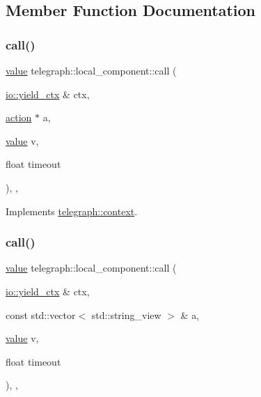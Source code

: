 \subsection{Member Function Documentation}
\mbox{\label{classtelegraph_1_1local__component_af4d74d161754055d3f811bfe95a59f26}} 
\subsubsection{\texorpdfstring{call()}{call()}\hspace{0.1cm}{\footnotesize\ttfamily [1/2]}}
{\footnotesize\ttfamily \hyperlink{classtelegraph_1_1value}{value} telegraph\+::local\+\_\+component\+::call (\begin{DoxyParamCaption}\item[{\hyperlink{structboost_1_1asio_1_1yield__ctx}{io\+::yield\+\_\+ctx} \&}]{ctx,  }\item[{\hyperlink{classtelegraph_1_1action}{action} $\ast$}]{a,  }\item[{\hyperlink{classtelegraph_1_1value}{value}}]{v,  }\item[{float}]{timeout }\end{DoxyParamCaption})\hspace{0.3cm}{\ttfamily [inline]}, {\ttfamily [override]}, {\ttfamily [virtual]}}



Implements \hyperlink{classtelegraph_1_1context_a72da471eb635e5505b10d2f1103359ac}{telegraph\+::context}.

\mbox{\label{classtelegraph_1_1local__component_a6fa6fbf49a0d77a8da54b4a77b578edd}} 
\subsubsection{\texorpdfstring{call()}{call()}\hspace{0.1cm}{\footnotesize\ttfamily [2/2]}}
{\footnotesize\ttfamily \hyperlink{classtelegraph_1_1value}{value} telegraph\+::local\+\_\+component\+::call (\begin{DoxyParamCaption}\item[{\hyperlink{structboost_1_1asio_1_1yield__ctx}{io\+::yield\+\_\+ctx} \&}]{ctx,  }\item[{const std\+::vector$<$ std\+::string\+\_\+view $>$ \&}]{a,  }\item[{\hyperlink{classtelegraph_1_1value}{value}}]{v,  }\item[{float}]{timeout }\end{DoxyParamCaption})\hspace{0.3cm}{\ttfamily [inline]}, {\ttfamily [override]}, {\ttfamily [virtual]}}




